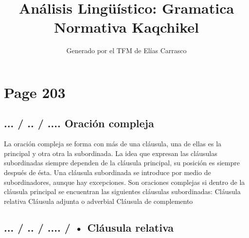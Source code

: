 \documentclass{article}%
\title{Análisis Lingüístico: Gramatica Normativa Kaqchikel}%
\author{Generado por el TFM de Elías Carrasco}%
\begin{document}
%
\normalsize%
\maketitle%
\section{Page 203}%
\label{sec:Page203}%
\subsection{... / .. / .... Oración compleja}%
\label{subsec:.../../....Oracincompleja}%

%
La oración compleja se forma con más de una cláusula, una de ellas es la principal y otra %
otra la subordinada. La idea que expresan las cláusulas subordinadas siempre dependen %
de la cláusula principal, su posición es siempre después de ésta. Una cláusula subordinada %
se introduce por medio de subordinadores, aunque hay excepciones. Son oraciones %
complejas si dentro de la cláusula principal se encuentran las siguientes cláusulas %
subordinadas: %
Cláusula relativa %
Cláusula adjunta o adverbial %
Cláusula de complemento %
\subsection{... / .. / .... / • Cláusula relativa}%
\label{subsec:.../../..../Clusularelativa}%
\end{document}
